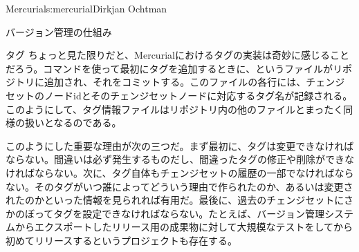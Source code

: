 \begin{aosachapter}{Mercurial}{s:mercurial}{Dirkjan Ochtman}
\begin{aosasect1}{バージョン管理の仕組み}
\begin{aosasect2}{タグ}
ちょっと見た限りだと、Mercurialにおけるタグの実装は奇妙に感じることだろう。コマンドを使って最初にタグを追加するときに、というファイルがリポジトリに追加され、それをコミットする。このファイルの各行には、チェンジセットのノードidとそのチェンジセットノードに対応するタグ名が記録される。このようにして、タグ情報ファイルはリポジトリ内の他のファイルとまったく同様の扱いとなるのである。

このようにした重要な理由が次の三つだ。まず最初に、タグは変更できなければならない。間違いは必ず発生するものだし、間違ったタグの修正や削除ができなければならない。次に、タグ自体もチェンジセットの履歴の一部でなければならない。そのタグがいつ誰によってどういう理由で作られたのか、あるいは変更されたのかといった情報を見られれば有用だ。最後に、過去のチェンジセットにさかのぼってタグを設定できなければならない。たとえば、バージョン管理システムからエクスポートしたリリース用の成果物に対して大規模なテストをしてから初めてリリースするというプロジェクトも存在する。


\end{aosasect2}
\end{aosasect1}
\end{aosachapter}
